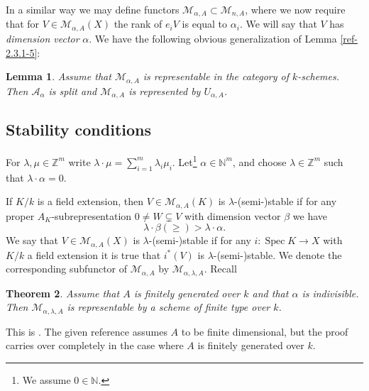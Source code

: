 \documentclass{amsart}
\numberwithin{equation}{section}
\let\cal\mathcal
\let\blb\mathbb
\newtheorem{lemmas}{Lemma}[subsection]
\newtheorem{theorems}[lemmas]{Theorem}
\theoremstyle{definition}
\theoremstyle{remark}
\begin{document}
In a similar way we may define functors ${{\cal M}}_{\alpha,A}\subset {{\cal M}}_{n,A}$, where we now
require that for $V\in {{\cal M}}_{\alpha,A}(X)$ the rank of $e_i V$ is equal to $\alpha_i$. We will say that 
 $V$ has \emph{dimension vector} $\alpha$.
We have the following obvious generalization of Lemma \ref{ref-2.3.1-5}:
\begin{lemmas}
\label{ref-2.4.1-9}
 Assume that ${{\cal M}}_{\alpha,A}$  is representable in the category of
$k$-schemes. Then ${{\cal A}}_\alpha$ is split and ${{\cal M}}_{\alpha,A}$ is represented by $U_{\alpha,A}$.
\end{lemmas}
\subsection{Stability conditions}
\label{ref-2.5-10}
For $\lambda,\mu\in {{\blb Z}}^{m}$ write $\lambda\cdot\mu=\sum_{i=1}^m \lambda_i\mu_i$. 
Let\footnote{We assume $0\in{{\blb N}}$.} $\alpha\in {{\blb N}}^{m}$,
and choose $\lambda\in {{\blb Z}}^{m}$ such that $\lambda\cdot \alpha=0$.

If $K/k$ is a
field extension, then $V\in {{\cal M}}_{\alpha,A}(K)$ is $\lambda$-(semi-)stable \cite{King}  if for any proper $A_K$-subrepresentation
$0\neq W\subsetneq V$ with dimension vector $\beta$  we have
\[
\lambda\cdot \beta(\ge)> \lambda\cdot\alpha.
\]
We say that $V\in {{\cal M}}_{\alpha,A}(X)$ is $\lambda$-(semi-)stable if for any $i:{\operatorname {Spec}} K{\rightarrow} X$
with $K/k$ a field extension it is true that $i^\ast(V)$ is $\lambda$-(semi-)stable.
We denote the corresponding subfunctor of ${{\cal M}}_{\alpha,A}$  by ${{\cal M}}_{\alpha,\lambda,A}$.
Recall 
\begin{theorems}
Assume that $A$ is finitely generated over $k$ and that $\alpha$ is indivisible. Then
${{\cal M}}_{\alpha,\lambda,A}$ is
representable by a scheme of finite type over $k$.
\end{theorems}
This is  \cite[Prop 5.3]{King}. The given reference assumes $A$ to be finite dimensional, but the proof carries over completely in the case where $A$ is finitely generated over $k$.
\end{document}

